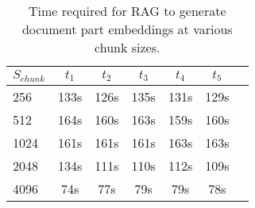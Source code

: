 \begin{table*}[ht!]
    \centering
    \begin{tabular}{lcccccc}
      \toprule
      $S_{chunk}$ & $t_1$ & $t_2$ & $t_3$ & $t_4$ & $t_5$ \\
      \midrule
      256  & 133s & 126s & 135s & 131s & 129s \\
      512  & 164s & 160s & 163s & 159s & 160s \\
      1024  & 161s & 161s & 161s & 163s & 163s \\
      2048  & 134s & 111s & 110s & 112s & 109s \\
      4096  & 74s & 77s & 79s & 79s & 78s \\
      \bottomrule
    \end{tabular}
    \caption{Time required for \ac{RAG} to generate document part embeddings at various chunk sizes.}
    \label{tab:RAG_time}
  \end{table*}
  

